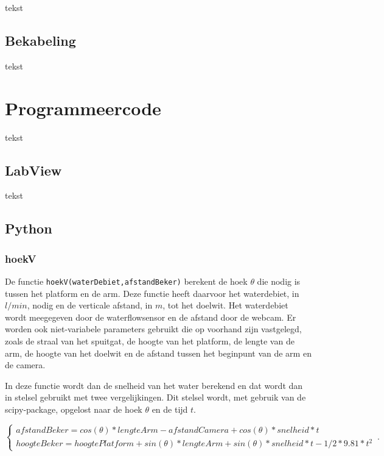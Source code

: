\documentclass[kulak]{kulakarticle} %
\begin{document}
	tekst
	
	
	\subsection{Bekabeling}
	
	tekst
	
	
	
	\section{Programmeercode}
	
	tekst
	
	
	\subsection{LabView}
	
	tekst
	
	
	\subsection{Python}
	\subsubsection{hoekV}
		De functie \verb*|hoekV(waterDebiet,afstandBeker)| berekent de hoek \(\theta\)  die nodig is tussen het platform en de arm. Deze functie heeft daarvoor het waterdebiet, in \(l/min\), nodig en de verticale afstand, in \(m\), tot het doelwit. Het waterdebiet wordt meegegeven door de waterflowsensor en de afstand door de webcam. Er worden ook niet-variabele parameters gebruikt die op voorhand zijn vastgelegd, zoals de straal van het spuitgat, de hoogte van het platform, de lengte van de arm, de hoogte van het doelwit en de afstand tussen het beginpunt van de arm en de camera. 
		
		In deze functie wordt dan de snelheid van het water berekend en dat wordt dan in stelsel gebruikt met twee vergelijkingen. Dit stelsel wordt, met gebruik van de scipy-package, opgelost naar de hoek \(\theta\) en de tijd \(t\).
		
		\begin{equation}
			\begin{cases}
			afstandBeker  = cos(\theta )*lengteArm - afstandCamera + cos(\theta )*snelheid*t \\ 
			hoogteBeker  =  hoogtePlatform + sin(\theta )*lengteArm + sin(\theta )*snelheid*t - 1/2*9.81*t^2
			\end{cases}\,.
		\end{equation}
		
\end{document}
